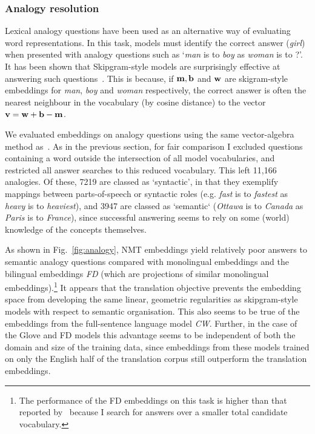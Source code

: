 \subsubsection{Analogy resolution}

Lexical analogy questions have been used as an alternative way of evaluating word representations. In this task, models must identify the correct answer (\emph{girl}) when presented with analogy questions such as `\emph{man} is to \emph{boy} as \emph{woman} is to ?'. It has been shown that Skipgram-style models are surprisingly effective at answering such questions~\citep{mikolov2013distributed}. This is because, if \( \bf m, b \) and \( \bf w\) are skigram-style embeddings for \emph{man}, \emph{boy} and \emph{woman} respectively, the correct answer is often the nearest neighbour in the vocabulary (by cosine distance) to the vector \( \bf v = w + b - m \). 

We evaluated embeddings on analogy questions using the same vector-algebra method as~\cite{mikolov2013distributed}. As in the previous section, for fair comparison I excluded questions containing a word outside the intersection of all model vocabularies, and restricted all answer searches to this reduced vocabulary. This left 11,166 analogies. Of these, 7219 are classed as `syntactic', in that they exemplify mappings between parts-of-speech or syntactic roles (e.g. \emph{fast} is to \emph{fastest} as \emph{heavy} is to \emph{heaviest}), and 3947 are classed as `semantic` (\emph{Ottawa} is to \emph{Canada} as \emph{Paris} is to \emph{France}), since successful answering seems to rely on some (world) knowledge of the concepts themselves. 

As shown in Fig.~\ref{fig:analogy}, NMT embeddings yield relatively poor answers to semantic analogy questions compared with monolingual embeddings and the bilingual embeddings \emph{FD} (which are projections of similar monolingual embeddings).\footnote{The performance of the FD embeddings on this task is higher than that reported by~\cite{faruqui2014improving} because I search for answers over a smaller total candidate vocabulary.} It appears that the translation objective prevents the embedding space from developing the same linear, geometric regularities as skipgram-style models with respect to semantic organisation. This also seems to be true of the embeddings from the full-sentence language model \emph{CW}. Further, in the case of the Glove and FD models this advantage seems to be independent of both the domain and size of the training data, since embeddings from these models trained on only the English half of the translation corpus still outperform the translation embeddings. 

